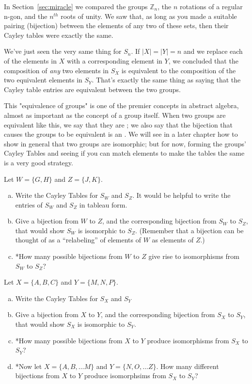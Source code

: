 In Section~\ref{sec:miracle} we compared the groups $\mathbb{Z}_n$, the $n$ rotations of a regular n-gon, and the $n^{th}$ roots of unity.  We saw that, as long as you made a suitable pairing (bijection) between the elements of any two of these sets, then their Cayley tables were exactly the same. 

We've just seen the very same thing for $S_n$. If  $|X| = |Y| = n$ and we replace each of the elements in $X$ with a corresponding element in $Y$, we concluded that the composition of \emph{any} two elements in $S_X$ is equivalent to the composition of the two equivalent elements in $S_Y$.  That's exactly the same thing as saying that  the Cayley table entries are equivalent between the two groups.

This "equivalence of groups" is one of the premier concepts in abstract algebra, almost as important as the concept of a group  itself.  When two groups are equivalent like this, we say that they are ; we also say that the bijection that causes the groups to be equivalent is an .  We will see in a later chapter how to show in general that two groups are isomorphic; but for now, forming the groups' Cayley Tables and seeing if you can match elements to make the tables the same is a very good strategy.

\begin{exercise}{}
Let $W =\{G, H \}$ and $Z = \{J, K \}$.
\begin{enumerate}[(a)]
\item
Write the Cayley Tables for $S_W$ and $S_Z$. It would be helpful to write the entries of $S_W$ and $S_Z$ in tableau form. 
\item
Give a bijection from $W$ to $Z$, and the corresponding bijection from $S_W$ to $S_Z$, that would show $S_W$ is isomorphic to $S_Z$. (Remember that a bijection can be thought of as  a ``relabeling'' of elements of $W$ as elements of $Z$.)
\item
*How many possible bijections from $W$ to $Z$ give rise to isomorphisms from  $S_W$ to  $S_Z$?
\end{enumerate}
\end{exercise}


\begin{exercise}{11}
Let $X =\{A, B, C\}$ and $Y = \{M, N, P\}$.
\begin{enumerate}[(a)]
\item
Write the Cayley Tables for $S_X$ and $S_Y$
\item
Give a bijection from $X$ to $Y$, and the corresponding bijection from $S_X$ to $S_Y$, that would show $S_X$ is isomorphic to $S_Y$.
\item
*How many possible bijections from $X$ to $Y$ produce isomorphisms from $S_X$ to $S_Y$?
\item
*Now let $X =\{A, B, \ldots M\}$ and $Y = \{N, O, \ldots Z\}$. How many different bijections from $X$ to $Y$ produce isomorphsims from $S_X$ to $S_Y$?

\end{enumerate}
\end{exercise}

